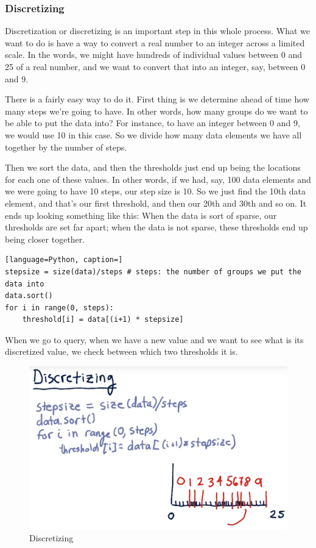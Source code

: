 \documentclass[12pt]{article}
\begin{document}
\subsubsection{Discretizing}

Discretization or discretizing is an important step in this whole process. What we want to do is have a way to convert a real number to an integer across a limited scale. In the words, we might have hundreds of individual values between 0 and 25 of a real number, and we want to convert that into an integer, say, between 0 and 9. 

There is a fairly easy way to do it. First thing is we determine ahead of time how many steps we're going to have. In other words, how many groups do we want to be able to put the data into? For instance, to have an integer between 0 and 9, we would use 10 in this case. So we divide how many data elements we have all together by the number of steps. 

Then we sort the data, and then the thresholds just end up being the locations for each one of these values. In other words, if we had, say, 100 data elements and we were going to have 10 steps, our step size is 10. So we just find the 10th data element, and that's our first threshold, and then our 20th and 30th and so on. It ends up looking something like this: When the data is sort of sparse, our thresholds are set far apart; when the data is not sparse, these thresholds end up being closer together. 

\begin{lstlisting}[language=Python, caption=]
stepsize = size(data)/steps # steps: the number of groups we put the data into
data.sort()
for i in range(0, steps):
    threshold[i] = data[(i+1) * stepsize]
\end{lstlisting}

When we go to query, when we have a new value and we want to see what is its discretized value, we check between which two thresholds it is. 

\begin{figure}[!ht]
\centering
\includegraphics[scale=0.45]{fig/fig112}
\caption{Discretizing}
\end{figure}
\end{document}
